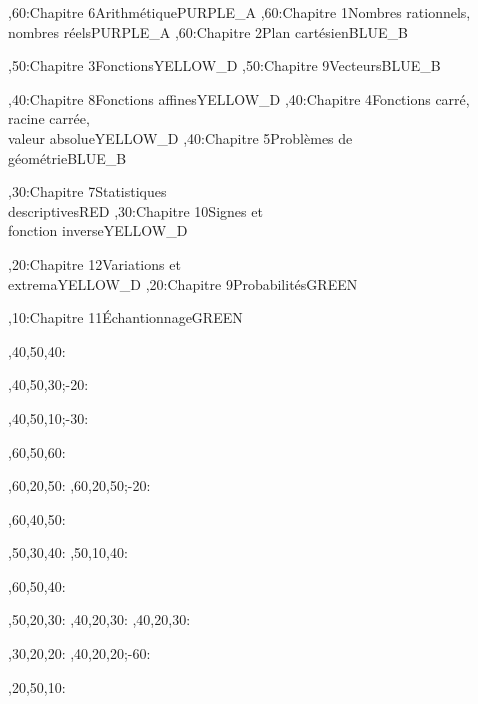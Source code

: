 \documentclass[tikz]{standalone}
\begin{document}
%
	\begin{chart}
	,60:{Chapitre 6}{Arithmétique}{}{PURPLE_A}
	,60:{Chapitre 1}{Nombres rationnels, \\ nombres réels}{}{PURPLE_A}
	,60:{Chapitre 2}{Plan cartésien}{}{BLUE_B}
	
	,50:{Chapitre 3}{Fonctions}{}{YELLOW_D}
	,50:{Chapitre 9}{Vecteurs}{}{BLUE_B}
	
	,40:{Chapitre 8}{Fonctions affines}{}{YELLOW_D}
	,40:{Chapitre 4}{Fonctions carré, \\ racine carrée, \\ valeur absolue}{}{YELLOW_D}
	,40:{Chapitre 5}{Problèmes de \\ géométrie}{}{BLUE_B}
	
	,30:{Chapitre 7}{Statistiques \\ descriptives}{}{RED}
	,30:{Chapitre 10}{Signes et \\ fonction inverse}{}{YELLOW_D}
	
	,20:{Chapitre 12}{Variations et \\ extrema}{}{YELLOW_D}
	,20:{Chapitre 9}{Probabilités}{}{GREEN}
	
	,10:{Chapitre 11}{Échantionnage}{}{GREEN}
	
	
	
	
	,40,50,40:
	
	
	,40,50,30;-20:
	
	
	,40,50,10;-30:

	,60,50,60:
	
	,60,20,50:
	,60,20,50;-20:
	
	,60,40,50:
	
	,50,30,40:
	,50,10,40:
	
	,60,50,40:
	
	,50,20,30:
	,40,20,30:
	,40,20,30:
	
	,30,20,20:
	,40,20,20;-60:
	
	,20,50,10:
	
	\end{chart}
%
\end{document}
